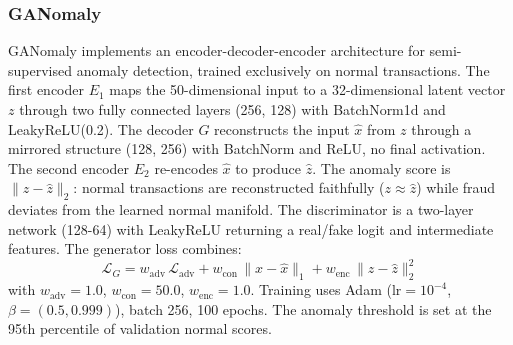 \documentclass[conference]{IEEEtran}
\begin{document}
\subsubsection{GANomaly}

GANomaly implements an encoder-decoder-encoder architecture for
semi-supervised anomaly detection, trained exclusively on normal transactions.
The first encoder $E_1$ maps the 50-dimensional input to a 32-dimensional
latent vector $z$ through two fully connected layers (256, 128) with
BatchNorm1d and LeakyReLU(0.2). The decoder $G$ reconstructs the input
$\hat{x}$ from $z$ through a mirrored structure (128, 256) with BatchNorm
and ReLU, no final activation. The second encoder $E_2$ re-encodes $\hat{x}$
to produce $\hat{z}$. The anomaly score is $\|z - \hat{z}\|_2$: normal
transactions are reconstructed faithfully ($z \approx \hat{z}$) while fraud
deviates from the learned normal manifold. The discriminator is a two-layer
network (128-64) with LeakyReLU returning a real/fake logit and intermediate
features. The generator loss combines:
\begin{equation}
\mathcal{L}_G = w_\text{adv}\,\mathcal{L}_\text{adv}
              + w_\text{con}\,\|x - \hat{x}\|_1
              + w_\text{enc}\,\|z - \hat{z}\|_2^2
\end{equation}
with $w_\text{adv}=1.0$, $w_\text{con}=50.0$, $w_\text{enc}=1.0$. Training
uses Adam ($\text{lr}=10^{-4}$, $\beta=(0.5, 0.999)$), batch 256, 100 epochs.
The anomaly threshold is set at the 95th percentile of validation normal
scores.
\end{document}
